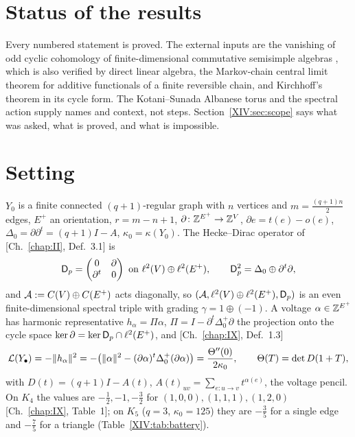 \section*{Status of the results}

Every numbered statement is proved. The external inputs are the vanishing of odd cyclic
cohomology of finite-dimensional commutative semisimple algebras \cite[Ch.~2]{Lo}, which is
also verified by direct linear algebra, the Markov-chain central limit theorem for
additive functionals of a finite reversible chain, and Kirchhoff's theorem in its cycle
form. The Kotani--Sunada Albanese torus \cite{KS1,KS2} and the spectral action
\cite{CC,JLO,Co} supply names and context, not steps. Section~\ref{XIV:sec:scope} says what
was asked, what is proved, and what is impossible.

\section{Setting}\label{XIV:sec:setting}

$Y_0$ is a finite connected $(q{+}1)$-regular graph with $n$ vertices and $m=\frac{(q+1)n}2$
edges, $E^{+}$ an orientation, $r=m-n+1$, $\partial\colon\mathbb{Z}^{E^{+}}\to\mathbb{Z}^{V}$,
$\partial e=t(e)-o(e)$, $\Delta_0=\partial\partial^{t}=(q{+}1)I-A$, $\kappa_0=\kappa(Y_0)$.
The Hecke--Dirac operator of [Ch.~\ref{chap:II}, Def.~3.1] is
\[
\Dp=\begin{pmatrix}0&\partial\\\partial^{t}&0\end{pmatrix}\ \text{on}\
\ell^{2}(V)\oplus\ell^{2}(E^{+}),\qquad
\Dp^{2}=\Delta_0\oplus\partial^{t}\partial ,
\]
and $\mathcal{A}:=C(V)\oplus C(E^{+})$ acts diagonally, so $(\mathcal{A},\ell^{2}(V)\oplus\ell^{2}(E^{+}),\mathsf{D}_p)$
is an even finite-dimensional spectral triple with grading $\gamma=1\oplus(-1)$. A voltage
$\alpha\in\mathbb{Z}^{E^{+}}$ has harmonic representative $h_\alpha=\Pi\alpha$,
$\Pi=I-\partial^{t}\Delta_0^{+}\partial$ the projection onto the cycle space
$\ker\partial=\ker\mathsf{D}_p\cap\ell^{2}(E^{+})$, and [Ch.~\ref{chap:IX}, Def.~1.3]
\[
\mathcal{L}(Y_\bullet)=-\|h_\alpha\|^{2}=-\bigl(\|\alpha\|^{2}-(\partial\alpha)^{t}\Delta_0^{+}(\partial\alpha)\bigr)
=\frac{\Theta''(0)}{2\kappa_0},\qquad \Theta(T)=\det D(1+T),
\]
with $D(t)=(q{+}1)I-A(t)$, $A(t)_{uv}=\sum_{e\colon u\to v}t^{\alpha(e)}$, the voltage
pencil. On $K_4$ the values are $-\frac12,-1,-\frac32$ for $(1,0,0),(1,1,1),(1,2,0)$
[Ch.~\ref{chap:IX}, Table~1]; on $K_5$ ($q=3$, $\kappa_0=125$) they are $-\frac35$ for a single edge and
$-\frac75$ for a triangle (Table~\ref{XIV:tab:battery}).

